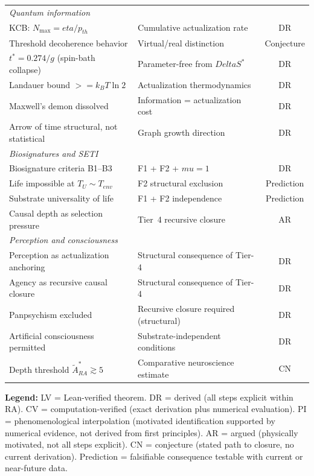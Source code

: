 \documentclass[11pt]{article}
\def\Delta{Delta}%
\def\mu{mu}%
\def\eta{eta}%
\def\mathrm#1{#1}%
\def\geq{>=}%
\begin{document}
\begin{center}
\begin{tabular}{llc}
\midrule
\multicolumn{3}{l}{\textit{Quantum information}} \\
KCB: $N_{\max}=\eta/p_{\mathrm{th}}$ & Cumulative actualization rate & DR \\
Threshold decoherence behavior & Virtual/real distinction & Conjecture \\
$t^*=0.274/g$ (spin-bath collapse) & Parameter-free from $\Delta S^*$ & DR \\
Landauer bound $\geq k_B T \ln 2$ & Actualization thermodynamics & DR \\
Maxwell's demon dissolved & Information = actualization cost & DR \\
Arrow of time structural, not statistical & Graph growth direction & DR \\
\midrule
\multicolumn{3}{l}{\textit{Biosignatures and SETI}} \\
Biosignature criteria B1--B3 & F1 + F2 + $\mu=1$ & DR \\
Life impossible at $T_U\sim T_{\mathrm{env}}$ & F2 structural exclusion & Prediction \\
Substrate universality of life & F1 + F2 independence & Prediction \\
Causal depth as selection pressure & Tier~4 recursive closure & AR \\
\midrule
\multicolumn{3}{l}{\textit{Perception and consciousness}} \\
Perception as actualization anchoring & Structural consequence of Tier-4 & DR \\
Agency as recursive causal closure & Structural consequence of Tier-4 & DR \\
Panpsychism excluded & Recursive closure required (structural) & DR \\
Artificial consciousness permitted & Substrate-independent conditions & DR \\
Depth threshold $\tilde{A}_{\mathrm{RA}}^* \gtrsim 5$ & Comparative neuroscience estimate & CN \\
\bottomrule
\end{tabular}
\end{center}

\textbf{Legend:} LV = Lean-verified theorem. DR = derived (all steps explicit within RA). CV = computation-verified (exact derivation plus numerical evaluation). PI = phenomenological interpolation (motivated identification supported by numerical evidence, not derived from first principles). AR = argued (physically motivated, not all steps explicit). CN = conjecture (stated path to closure, no current derivation). Prediction = falsifiable consequence testable with current or near-future data.
\end{document}
